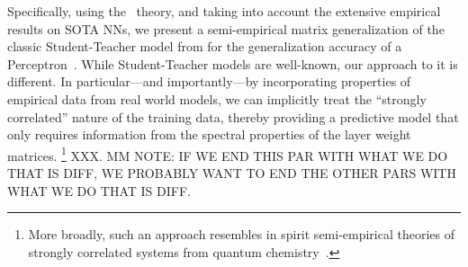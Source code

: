 Specifically, using the \HTSR~theory, and taking into account the extensive empirical results on SOTA NNs, we present a semi-empirical matrix generalization of the classic Student-Teacher model from \STATMECH for the generalization accuracy of a Perceptron~\cite{SST92, engle_complexity_2001,engel2001statistical,Opper01}.
While Student-Teacher models are well-known, our approach to it is different.
In particular---and importantly---by incorporating properties of empirical data from real world models, we can implicitly treat the ``strongly correlated'' nature of the training data, thereby providing a predictive model that only requires information from the spectral properties of the layer weight matrices.%
\footnote{More broadly, such an approach resembles in spirit semi-empirical theories of strongly correlated systems from quantum chemistry~\cite{Martin1996HighlyAA,martin1996redesigning, martin_reparametrizing_1998}.}
XXX.  MM NOTE: IF WE END THIS PAR WITH WHAT WE DO THAT IS DIFF, WE PROBABLY WANT TO END THE OTHER PARS WITH WHAT WE DO THAT IS DIFF.

